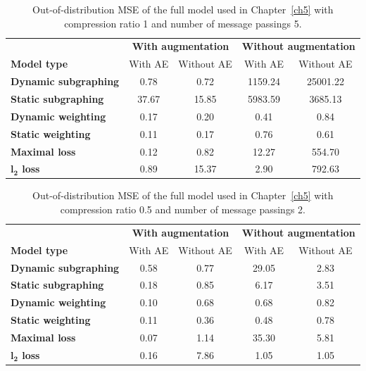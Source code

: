 \documentclass[12pt,a4paper]{report}
\begin{document}
\begin{appendices}
\begin{table}
\centering
\caption{Out-of-distribution MSE of the full model used in Chapter~\ref{ch5} with compression ratio 1 and number of message passings 5.}
\label{table_1_5}
\begin{tabular}{lcccc}
\toprule
 & \multicolumn{2}{c}{\textbf{With augmentation}} & \multicolumn{2}{c}{\textbf{Without augmentation}} \\
 \cmidrule{2-3} \cmidrule{4-5}
\textbf{Model type} & With AE & Without AE & With AE & Without AE \\
\midrule
\textbf{Dynamic subgraphing} & 0.78 & 0.72 & 1159.24 & 25001.22 \\
\textbf{Static subgraphing} & 37.67 & 15.85 & 5983.59 & 3685.13 \\
\textbf{Dynamic weighting} & 0.17 & 0.20 & 0.41 & 0.84 \\
\textbf{Static weighting} & 0.11 & 0.17 & 0.76 & 0.61 \\
\textbf{Maximal loss} & 0.12 & 0.82 & 12.27 & 554.70 \\
\textbf{$\boldsymbol{l_2}$ loss} & 0.89 & 15.37 & 2.90 & 792.63 \\
\bottomrule
\end{tabular}
\end{table}

\begin{table}
\centering
\caption{Out-of-distribution MSE of the full model used in Chapter~\ref{ch5} with compression ratio 0.5 and number of message passings 2.}
\label{table_0.5_2}
\begin{tabular}{lcccc}
\toprule
 & \multicolumn{2}{c}{\textbf{With augmentation}} & \multicolumn{2}{c}{\textbf{Without augmentation}} \\
 \cmidrule{2-3} \cmidrule{4-5}
\textbf{Model type} & With AE & Without AE & With AE & Without AE \\
\midrule
\textbf{Dynamic subgraphing} & 0.58 & 0.77 & 29.05 & 2.83 \\
\textbf{Static subgraphing} & 0.18 & 0.85 & 6.17 & 3.51 \\
\textbf{Dynamic weighting} & 0.10 & 0.68 & 0.68 & 0.82 \\
\textbf{Static weighting} & 0.11 & 0.36 & 0.48 & 0.78 \\
\textbf{Maximal loss} & 0.07 & 1.14 & 35.30 & 5.81 \\
\textbf{$\boldsymbol{l_2}$ loss} & 0.16 & 7.86 & 1.05 & 1.05 \\
\bottomrule
\end{tabular}
\end{table}


\end{appendices}
\end{document}
